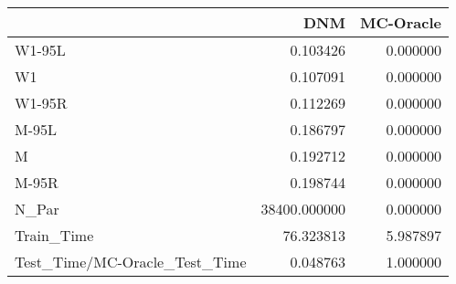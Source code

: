 \begin{tabular}{lrr}
\toprule
{} &           DNM &  MC-Oracle \\
\midrule
W1-95L                        &      0.103426 &   0.000000 \\
W1                            &      0.107091 &   0.000000 \\
W1-95R                        &      0.112269 &   0.000000 \\
M-95L                         &      0.186797 &   0.000000 \\
M                             &      0.192712 &   0.000000 \\
M-95R                         &      0.198744 &   0.000000 \\
N\_Par                         &  38400.000000 &   0.000000 \\
Train\_Time                    &     76.323813 &   5.987897 \\
Test\_Time/MC-Oracle\_Test\_Time &      0.048763 &   1.000000 \\
\bottomrule
\end{tabular}
